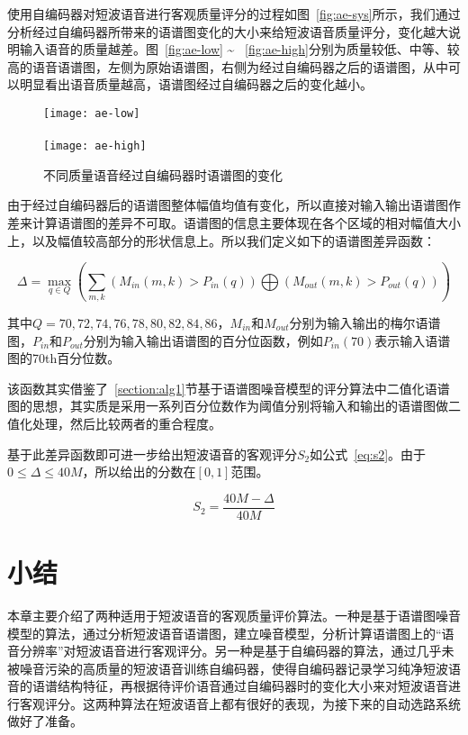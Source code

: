 使用自编码器对短波语音进行客观质量评分的过程如图~\ref{fig:ae-sys}所示，我们通过分析经过自编码器所带来的语谱图变化的大小来给短波语音质量评分，变化越大说明输入语音的质量越差。图~\ref{fig:ae-low} \~ ~\ref{fig:ae-high}分别为质量较低、中等、较高的语音语谱图，左侧为原始语谱图，右侧为经过自编码器之后的语谱图，从中可以明显看出语音质量越高，语谱图经过自编码器之后的变化越小。

\begin{figure}
\centering
{} {
    \texttt{[image: ae-low]}
}
\vspace{0.8ex}
\\
\vspace{0.8ex}
\\
 {
    \texttt{[image: ae-high]}
}
\vspace{0.8ex}
\\
\caption{不同质量语音经过自编码器时语谱图的变化\label{fig:ae-diffs}}
\end{figure}

由于经过自编码器后的语谱图整体幅值均值有变化，所以直接对输入输出语谱图作差来计算语谱图的差异不可取。语谱图的信息主要体现在各个区域的相对幅值大小上，以及幅值较高部分的形状信息上。所以我们定义如下的语谱图差异函数：

\begin{equation}
\Delta = \max\limits_{q \in Q}\left(\sum_{m, k} (M_{in}(m,k) > P_{in}(q)) \bigoplus (M_{out}(m,k) > P_{out}(q))\right)
\end{equation}

其中$Q={70,72,74,76,78,80,82,84,86}$，$M_{in}$和$M_{out}$分别为输入输出的梅尔语谱图，$P_{in}$和$P_{out}$分别为输入输出语谱图的百分位函数，例如$P_{in}(70)$表示输入语谱图的70th百分位数。

该函数其实借鉴了~\ref{section:alg1}节基于语谱图噪音模型的评分算法中二值化语谱图的思想，其实质是采用一系列百分位数作为阈值分别将输入和输出的语谱图做二值化处理，然后比较两者的重合程度。

基于此差异函数即可进一步给出短波语音的客观评分$S_2$如公式~\ref{eq:s2}。由于$0 \leq \Delta \leq 40M$，所以给出的分数在$[0, 1]$范围。

\begin{equation}\label{eq:s2}
S_2 = \frac{40M - \Delta}{40M}
\end{equation}

\section{小结}

本章主要介绍了两种适用于短波语音的客观质量评价算法。一种是基于语谱图噪音模型的算法，通过分析短波语音语谱图，建立噪音模型，分析计算语谱图上的“语音分辨率”对短波语音进行客观评分。另一种是基于自编码器的算法，通过几乎未被噪音污染的高质量的短波语音训练自编码器，使得自编码器记录学习纯净短波语音的语谱结构特征，再根据待评价语音通过自编码器时的变化大小来对短波语音进行客观评分。这两种算法在短波语音上都有很好的表现，为接下来的自动选路系统做好了准备。